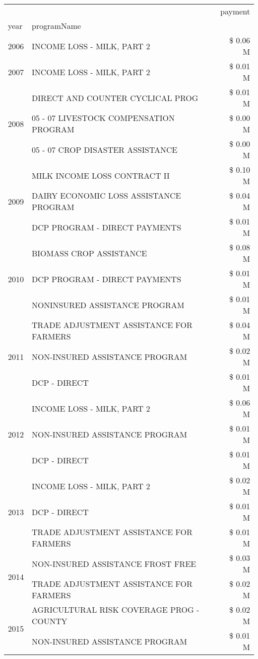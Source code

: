 \begin{tabular}{llr}
\toprule
 &  & payment \\
year & programName &  \\
\midrule
2006 & INCOME LOSS - MILK, PART 2 & \$ 0.06 M \\
\cline{1-3}
2007 & INCOME LOSS - MILK, PART 2 & \$ 0.01 M \\
\cline{1-3}
\multirow[t]{3}{*}{2008} & DIRECT AND COUNTER CYCLICAL PROG & \$ 0.01 M \\
 & 05 - 07 LIVESTOCK COMPENSATION PROGRAM & \$ 0.00 M \\
 & 05 - 07 CROP DISASTER ASSISTANCE & \$ 0.00 M \\
\cline{1-3}
\multirow[t]{3}{*}{2009} & MILK INCOME LOSS CONTRACT II & \$ 0.10 M \\
 & DAIRY ECONOMIC LOSS ASSISTANCE PROGRAM & \$ 0.04 M \\
 & DCP PROGRAM - DIRECT PAYMENTS & \$ 0.01 M \\
\cline{1-3}
\multirow[t]{3}{*}{2010} & BIOMASS CROP ASSISTANCE & \$ 0.08 M \\
 & DCP PROGRAM - DIRECT PAYMENTS & \$ 0.01 M \\
 & NONINSURED ASSISTANCE PROGRAM & \$ 0.01 M \\
\cline{1-3}
\multirow[t]{3}{*}{2011} & TRADE ADJUSTMENT ASSISTANCE FOR FARMERS & \$ 0.04 M \\
 & NON-INSURED ASSISTANCE PROGRAM & \$ 0.02 M \\
 & DCP - DIRECT & \$ 0.01 M \\
\cline{1-3}
\multirow[t]{3}{*}{2012} & INCOME LOSS - MILK, PART 2 & \$ 0.06 M \\
 & NON-INSURED ASSISTANCE PROGRAM & \$ 0.01 M \\
 & DCP - DIRECT & \$ 0.01 M \\
\cline{1-3}
\multirow[t]{3}{*}{2013} & INCOME LOSS - MILK, PART 2 & \$ 0.02 M \\
 & DCP - DIRECT & \$ 0.01 M \\
 & TRADE ADJUSTMENT ASSISTANCE FOR FARMERS & \$ 0.01 M \\
\cline{1-3}
\multirow[t]{2}{*}{2014} & NON-INSURED ASSISTANCE FROST FREE & \$ 0.03 M \\
 & TRADE ADJUSTMENT ASSISTANCE FOR FARMERS & \$ 0.02 M \\
\cline{1-3}
\multirow[t]{3}{*}{2015} & AGRICULTURAL RISK COVERAGE PROG - COUNTY & \$ 0.02 M \\
 & NON-INSURED ASSISTANCE PROGRAM & \$ 0.01 M \\

\end{tabular}
